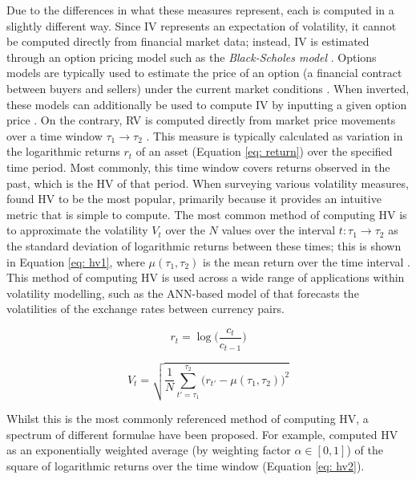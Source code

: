 \documentclass[a4paper, 11pt]{report}
\begin{document}
    Due to the differences in what these measures represent, each is computed in a slightly different way. Since IV represents an expectation of volatility, it cannot be computed directly from financial market data; instead, IV is estimated through an option pricing model such as the \emph{Black-Scholes model} \citep{black-1973}. Options models are typically used to estimate the price of an option (a financial contract between buyers and sellers) under the current market conditions \citep{wu-2015}. When inverted, these models can additionally be used to compute IV by inputting a given option price \citep{tino-2001}. On the contrary, RV is computed directly from market price movements over a time window $\tau_1 \to \tau_2$ \citep{ge-2022}. This measure is typically calculated as variation in the logarithmic returns $r_t$ of an asset (Equation \ref{eq: return}) over the specified time period. Most commonly, this time window covers returns observed in the past, which is the HV of that period. When surveying various volatility measures, \citet{ge-2022} found HV to be the most popular, primarily because it provides an intuitive metric that is simple to compute. The most common method of computing HV is to approximate the volatility $V_t$ over the $N$ values over the interval $t \colon \tau_1 \to \tau_2$ as the standard deviation of logarithmic returns between these times; this is shown in Equation \ref{eq: hv1}, where $\mu(\tau_1, \tau_2)$ is the mean return over the time interval \citep{ge-2022}. This method of computing HV is used across a wide range of applications within volatility modelling, such as the ANN-based model of \citet{lahmiri-2017} that forecasts the volatilities of the exchange rates between currency pairs.

    \begin{equation}
        \label{eq: return}
        r_t = \log\Big(\frac{c_t}{c_{t-1}}\Big)
    \end{equation}

    \begin{equation}
        \label{eq: hv1}
        V_t = \sqrt{ \frac{1}{N} \sum_{t' = \tau_1}^{\tau_2} \big( r_{t'} - \mu(\tau_1, \tau_2) \big)^2 }
    \end{equation}

    Whilst this is the most commonly referenced method of computing HV, a spectrum of different formulae have been proposed. For example, \citet{tino-2001} computed HV as an exponentially weighted average (by weighting factor $\alpha \in [0, 1]$) of the square of logarithmic returns over the time window (Equation \ref{eq: hv2}). 
\end{document}
